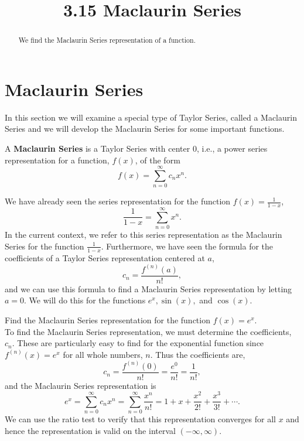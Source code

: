 \documentclass{ximera}
\title{3.15 Maclaurin Series}
\begin{document}
\begin{abstract}
We find the Maclaurin Series representation of a function.
\end{abstract}

\maketitle

\section{Maclaurin Series}


In this section we will examine a special type of Taylor Series, called a Maclaurin Series and we will develop the Maclaurin Series for 
some important functions.

\begin{definition} 
A \textbf{Maclaurin Series} is a Taylor Series with center 0, i.e., a power series representation 
for a function, $f(x)$, of the form
\[
f(x) = \sum_{n=0}^\infty c_n x^n.
\]
\end{definition}
 
We have already seen the series representation for the function $f(x) = \frac{1}{1-x}$,
\[
\frac{1}{1-x} = \sum_{n=0}^\infty  x^n.
\]
In the current context, we refer to this series representation as the Maclaurin Series for the function $\frac{1}{1-x}$.
Furthermore, we have seen the formula for the coefficients of a Taylor Series representation centered at $a$,
\[
c_n = \frac{f^{(n)}(a)}{n!},
\]
and we can use this formula to find a Maclaurin Series representation by letting $a = 0$.
We will do this for the functions $e^x, \sin(x),$ and $\cos(x)$.

\begin{example} 
Find the Maclaurin Series representation for the function $f(x) = e^x$.\\
To find the Maclaurin Series representation, we must determine the coefficients, $c_n$. These are particularly easy to find for the exponential function
since $f^{(n)}(x) = e^x$ for all whole numbers, $n$. Thus the coefficients are,
\[
c_n = \frac{f^{(n)}(0)}{n!} = \frac{e^0}{n!} = \frac{1}{n!},
\]
and the Maclaurin Series representation is 
\[
e^x = \sum_{n=0}^\infty c_n x^n = \sum_{n=0}^\infty \frac{x^n}{n!} = 1 + x + \frac{x^2}{2!} + \frac{x^3}{3!} + \cdots.
\]
We can use the ratio test to verify that this representation converges for all $x$ and 
hence the representation is valid on the interval $(-\infty, \infty)$.
\end{example}
\end{document}
